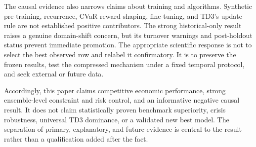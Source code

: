 The causal evidence also narrows claims about training and algorithms. Synthetic pre-training, recurrence, CVaR reward shaping, fine-tuning, and TD3's update rule are not established positive contributors. The strong historical-only result raises a genuine domain-shift concern, but its turnover warnings and post-holdout status prevent immediate promotion. The appropriate scientific response is not to select the best observed row and relabel it confirmatory. It is to preserve the frozen results, test the compressed mechanism under a fixed temporal protocol, and seek external or future data.

Accordingly, this paper claims competitive economic performance, strong ensemble-level constraint and risk control, and an informative negative causal result. It does not claim statistically proven benchmark superiority, crisis robustness, universal TD3 dominance, or a validated new best model. The separation of primary, explanatory, and future evidence is central to the result rather than a qualification added after the fact.
